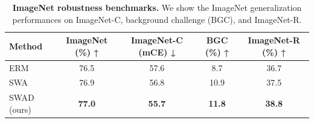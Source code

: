 \begin{table}[h]
\centering
\small
\caption{\small {\bf ImageNet robustness benchmarks.} We show the ImageNet generalization performances on ImageNet-C, background challenge (BGC), and ImageNet-R.}
\vspace{.5em}
\renewcommand{\arraystretch}{1.1}
\label{table:exploring_other_applications}
\begin{tabular}{lcccc} 
\toprule
\textbf{Method}       & ImageNet (\%) ↑ & ImageNet-C (mCE) ↓ & BGC (\%) ↑    & ImageNet-R (\%) ↑  \\
\midrule
ERM         & 76.5            & 57.6               & 8.7           & 36.7               \\
SWA         & 76.9            & 56.8               & 10.9          & 37.5               \\
SWAD (ours) & \textbf{77.0}   & \textbf{55.7}      & \textbf{11.8} & \textbf{38.8}      \\
\bottomrule
\end{tabular}
\end{table}